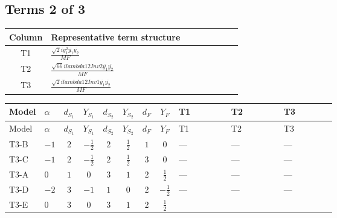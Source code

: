 \documentclass[8pt]{article}
\begin{document}
\begin{landscape}
\subsection*{Terms 2 of 3}
\begin{center}
\begin{tabular}{@{}c >{\raggedright\arraybackslash}p{0.82\linewidth}@{}}
\toprule
Column & Representative term structure \\
\midrule
T1 & \(\displaystyle \frac{\sqrt{2} i g_{1}^{2} \overline{y_{1}} \overline{y_{2}}}{MF}\) \\
\midrule
T2 & \(\displaystyle \frac{\sqrt{66} i lambda12Inv2 \overline{y_{1}} \overline{y_{2}}}{MF}\) \\
\midrule
T3 & \(\displaystyle \frac{\sqrt{2} i lambda12Inv1 \overline{y_{1}} \overline{y_{2}}}{MF}\) \\
\midrule
\bottomrule
\end{tabular}
\end{center}
\smallskip
\tiny
\begin{longtable}{@{}llcccccc >{\raggedright\arraybackslash}p{0.21\linewidth} >{\raggedright\arraybackslash}p{0.21\linewidth} >{\raggedright\arraybackslash}p{0.21\linewidth}@{}}
\toprule
Model & $\alpha$ & $d_{S_1}$ & $Y_{S_1}$ & $d_{S_2}$ & $Y_{S_2}$ & $d_F$ & $Y_F$ & T1 & T2 & T3 \\
\midrule
\endfirsthead
\toprule
Model & $\alpha$ & $d_{S_1}$ & $Y_{S_1}$ & $d_{S_2}$ & $Y_{S_2}$ & $d_F$ & $Y_F$ & T1 & T2 & T3 \\
\midrule
\endhead
T3-B & $-1$ & $2$ & $-\frac{1}{2}$ & $2$ & $\frac{1}{2}$ & $1$ & $0$ & --- & --- & --- \\
\midrule
T3-C & $-1$ & $2$ & $-\frac{1}{2}$ & $2$ & $\frac{1}{2}$ & $3$ & $0$ & --- & --- & --- \\
\midrule
T3-A & $0$ & $1$ & $0$ & $3$ & $1$ & $2$ & $\frac{1}{2}$ & --- & --- & --- \\
\midrule
T3-D & $-2$ & $3$ & $-1$ & $1$ & $0$ & $2$ & $-\frac{1}{2}$ & --- & --- & --- \\
\midrule
T3-E & $0$ & $3$ & $0$ & $3$ & $1$ & $2$ & $\frac{1}{2}$ & \scriptsize\adjustbox{max width=\linewidth}{$\begin{gathered} - \frac{3 \sqrt{2} i g_{1}^{2} \overline{y_{1}} \overline{y_{2}}}{16 MF}\end{gathered}$} & \scriptsize\adjustbox{max width=\linewidth}{$\begin{gathered} - \frac{3 \sqrt{66} i lambda12Inv2 \overline{y_{1}} \overline{y_{2}}}{44 MF}\end{gathered}$} & \scriptsize\adjustbox{max width=\linewidth}{$\begin{gathered} \frac{\sqrt{2} i lambda12Inv1 \overline{y_{1}} \overline{y_{2}}}{4 MF}\end{gathered}$} \\
\midrule
\bottomrule
\end{longtable}
\clearpage

\end{landscape}
\end{document}
